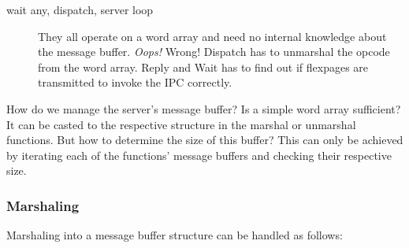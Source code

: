 \begin{description}
\item[wait any, dispatch, server loop] They all operate on a word
  array and need no internal knowledge about the message buffer.
  \emph{Oops!} Wrong! Dispatch has to unmarshal the opcode from the
  word array. Reply and Wait has to find out if flexpages are 
  transmitted to invoke the IPC correctly. 
  
\end{description}

How do we manage the server's message buffer?  Is a simple word array
sufficient?  It can be casted to the respective structure in the marshal or
unmarshal functions.  But how to determine the size of this buffer?  This can
only be achieved by iterating each of the functions' message buffers and
checking their respective size.

\subsubsection{Marshaling}
Marshaling into a message buffer structure can be handled as follows:

